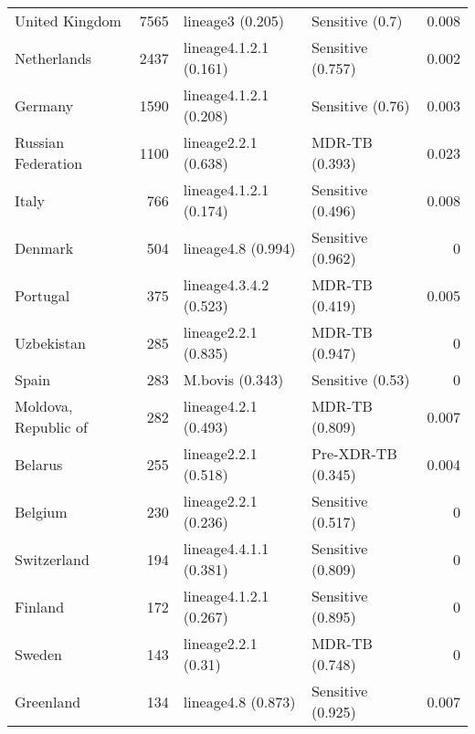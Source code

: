 \begin{tabular}{lrllr}
 United Kingdom                               &          7565 & lineage3 (0.205)         & Sensitive (0.7)     &      0.008 \\
 Netherlands                                  &          2437 & lineage4.1.2.1 (0.161)   & Sensitive (0.757)   &      0.002 \\
 Germany                                      &          1590 & lineage4.1.2.1 (0.208)   & Sensitive (0.76)    &      0.003 \\
 Russian Federation                           &          1100 & lineage2.2.1 (0.638)     & MDR-TB (0.393)      &      0.023 \\
 Italy                                        &           766 & lineage4.1.2.1 (0.174)   & Sensitive (0.496)   &      0.008 \\
 Denmark                                      &           504 & lineage4.8 (0.994)       & Sensitive (0.962)   &      0     \\
 Portugal                                     &           375 & lineage4.3.4.2 (0.523)   & MDR-TB (0.419)      &      0.005 \\
 Uzbekistan                                   &           285 & lineage2.2.1 (0.835)     & MDR-TB (0.947)      &      0     \\
 Spain                                        &           283 & M.bovis (0.343)          & Sensitive (0.53)    &      0     \\
 Moldova, Republic of                         &           282 & lineage4.2.1 (0.493)     & MDR-TB (0.809)      &      0.007 \\
 Belarus                                      &           255 & lineage2.2.1 (0.518)     & Pre-XDR-TB (0.345)  &      0.004 \\
 Belgium                                      &           230 & lineage2.2.1 (0.236)     & Sensitive (0.517)   &      0     \\
 Switzerland                                  &           194 & lineage4.4.1.1 (0.381)   & Sensitive (0.809)   &      0     \\
 Finland                                      &           172 & lineage4.1.2.1 (0.267)   & Sensitive (0.895)   &      0     \\
 Sweden                                       &           143 & lineage2.2.1 (0.31)      & MDR-TB (0.748)      &      0     \\
 Greenland                                    &           134 & lineage4.8 (0.873)       & Sensitive (0.925)   &      0.007 \\

\end{tabular}
